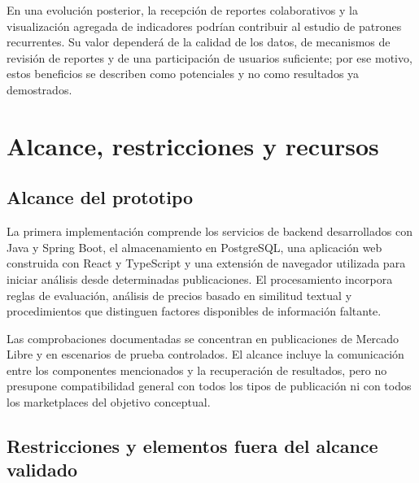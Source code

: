 En una evolución posterior, la recepción de reportes colaborativos y la visualización agregada de indicadores podrían contribuir al estudio de patrones recurrentes. Su valor dependerá de la calidad de los datos, de mecanismos de revisión de reportes y de una participación de usuarios suficiente; por ese motivo, estos beneficios se describen como potenciales y no como resultados ya demostrados.

\section{Alcance, restricciones y recursos}\label{sec:ml-alcance}

\subsection{Alcance del prototipo}\label{subsec:ml-alcance-prototipo}

La primera implementación comprende los servicios de backend desarrollados con Java y Spring Boot, el almacenamiento en PostgreSQL, una aplicación web construida con React y TypeScript y una extensión de navegador utilizada para iniciar análisis desde determinadas publicaciones. El procesamiento incorpora reglas de evaluación, análisis de precios basado en similitud textual y procedimientos que distinguen factores disponibles de información faltante.

Las comprobaciones documentadas se concentran en publicaciones de Mercado Libre y en escenarios de prueba controlados. El alcance incluye la comunicación entre los componentes mencionados y la recuperación de resultados, pero no presupone compatibilidad general con todos los tipos de publicación ni con todos los marketplaces del objetivo conceptual.

\subsection{Restricciones y elementos fuera del alcance validado}\label{subsec:ml-restricciones}

